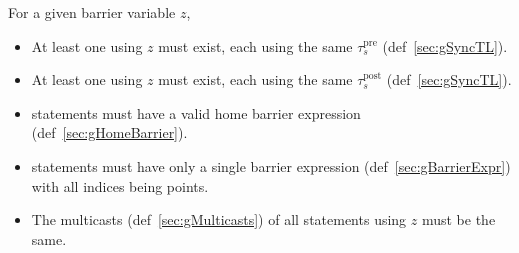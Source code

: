 
For a given barrier variable $z$,
\begin{itemize}
  \item At least one  using $z$ must exist, each using the same $\tau_s^\mathrm{pre}$ (def~\ref{sec:gSyncTL}).
  \item At least one  using $z$ must exist, each using the same $\tau_s^\mathrm{post}$ (def~\ref{sec:gSyncTL}).
  \item {} statements must have a valid home barrier expression (def~\ref{sec:gHomeBarrier}).
  \item {} statements must have only a single barrier expression (def~\ref{sec:gBarrierExpr}) with all indices being points.
  \item The multicasts (def~\ref{sec:gMulticasts}) of all  statements using $z$ must be the same.
\end{itemize}

